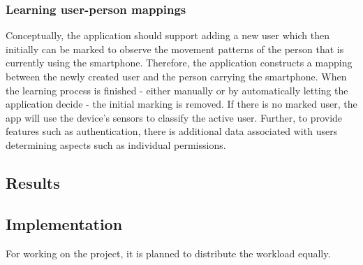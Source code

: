 \documentclass{article}
\begin{document}
\subsubsection{Learning user-person mappings}
Conceptually, the application should support adding a new user which then initially can be marked to observe the movement patterns of the person that is currently using the smartphone. Therefore, the application constructs a mapping between the newly created user and the person carrying the smartphone. When the learning process is finished - either manually or by automatically letting the application decide - the initial marking is removed. If there is no marked user, the app will use the device's sensors to classify the active user. Further, to provide features such as authentication, there is additional data associated with users determining aspects such as individual permissions.

\subsection{Results}

\subsection{Implementation}
For working on the project, it is planned to distribute the workload equally.



\end{document}

